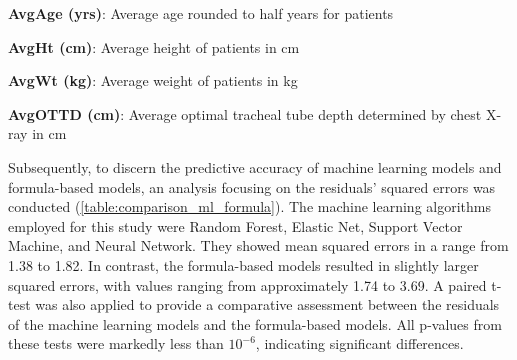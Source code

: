 \documentclass[11pt]{article}
\begin{document}
\begin{table}[h]
\caption{Statistical analysis of patient data by sex}
\label{table:summary_stats_sex}
\begin{threeparttable}
\renewcommand{\TPTminimum}{\linewidth}
\begin{tablenotes}
\footnotesize
\item \textbf{AvgAge (yrs)}: Average age rounded to half years for patients
\item \textbf{AvgHt (cm)}: Average height of patients in cm
\item \textbf{AvgWt (kg)}: Average weight of patients in kg
\item \textbf{AvgOTTD (cm)}: Average optimal tracheal tube depth determined by chest X-ray in cm
\end{tablenotes}
\end{threeparttable}
\end{table}


Subsequently, to discern the predictive accuracy of machine learning models and formula-based models, an analysis focusing on the residuals' squared errors was conducted (\ref{table:comparison_ml_formula}). The machine learning algorithms employed for this study were Random Forest, Elastic Net, Support Vector Machine, and Neural Network. They showed mean squared errors in a range from 1.38 to 1.82. In contrast, the formula-based models resulted in slightly larger squared errors, with values ranging from approximately 1.74 to 3.69. A paired t-test was also applied to provide a comparative assessment between the residuals of the machine learning models and the formula-based models. All p-values from these tests were markedly less than $10^{-6}$, indicating significant differences.
\end{document}

